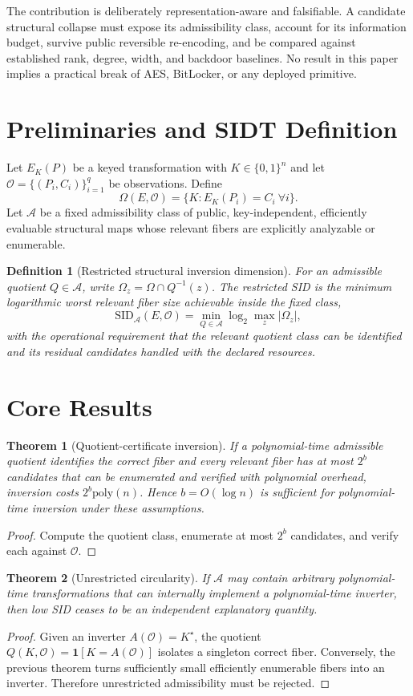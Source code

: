 \documentclass[11pt]{article}
\newtheorem{theorem}{Theorem}
\newtheorem{definition}{Definition}
\begin{document}
The contribution is deliberately representation-aware and falsifiable. A candidate structural collapse must expose its admissibility class, account for its information budget, survive public reversible re-encoding, and be compared against established rank, degree, width, and backdoor baselines. No result in this paper implies a practical break of AES, BitLocker, or any deployed primitive.

\section{Preliminaries and SIDT Definition}
Let $E_K(P)$ be a keyed transformation with $K\in\{0,1\}^n$ and let $\mathcal O=\{(P_i,C_i)\}_{i=1}^q$ be observations. Define
\[
\Omega(E,\mathcal O)=\{K:E_K(P_i)=C_i\ \forall i\}.
\]
Let $\mathcal A$ be a fixed admissibility class of public, key-independent, efficiently evaluable structural maps whose relevant fibers are explicitly analyzable or enumerable.

\begin{definition}[Restricted structural inversion dimension]
For an admissible quotient $Q\in\mathcal A$, write $\Omega_z=\Omega\cap Q^{-1}(z)$. The restricted SID is the minimum logarithmic worst relevant fiber size achievable inside the fixed class,
\[
\mathrm{SID}_{\mathcal A}(E,\mathcal O)=\min_{Q\in\mathcal A}\log_2\max_z |\Omega_z|,
\]
with the operational requirement that the relevant quotient class can be identified and its residual candidates handled with the declared resources.
\end{definition}

\section{Core Results}
\begin{theorem}[Quotient-certificate inversion]
If a polynomial-time admissible quotient identifies the correct fiber and every relevant fiber has at most $2^b$ candidates that can be enumerated and verified with polynomial overhead, inversion costs $2^b\mathrm{poly}(n)$. Hence $b=O(\log n)$ is sufficient for polynomial-time inversion under these assumptions.
\end{theorem}
\begin{proof}
Compute the quotient class, enumerate at most $2^b$ candidates, and verify each against $\mathcal O$.
\end{proof}

\begin{theorem}[Unrestricted circularity]
If $\mathcal A$ may contain arbitrary polynomial-time transformations that can internally implement a polynomial-time inverter, then low SID ceases to be an independent explanatory quantity.
\end{theorem}
\begin{proof}
Given an inverter $A(\mathcal O)=K^\star$, the quotient $Q(K,\mathcal O)=\mathbf 1[K=A(\mathcal O)]$ isolates a singleton correct fiber. Conversely, the previous theorem turns sufficiently small efficiently enumerable fibers into an inverter. Therefore unrestricted admissibility must be rejected.
\end{proof}
\end{document}
